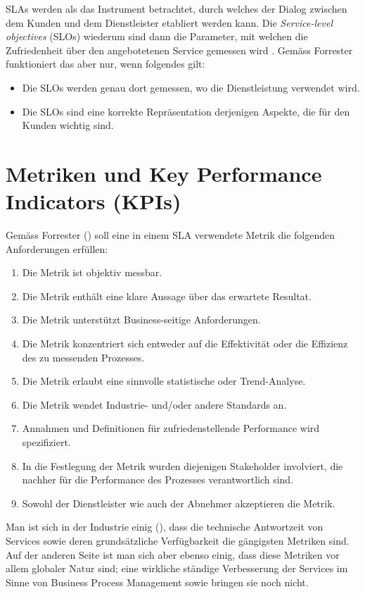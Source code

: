 \documentclass[11pt,listof=totoc]{scrreprt} %
\theoremstyle{definition}
\begin{document}
SLAs werden als das Instrument betrachtet, durch welches der Dialog zwischen dem Kunden und dem Dienstleister etabliert werden kann. Die {\em Service-level objectives} (SLOs) wiederum sind dann die Parameter, mit welchen die Zufriedenheit über den angebotetenen Service gemessen wird \cite{forrester:slaBestPractices}. Gemäss Forrester funktioniert das aber nur, wenn folgendes gilt:

\begin{itemize}
\item Die SLOs werden genau dort gemessen, wo die Dienstleistung verwendet wird.
\item Die SLOs sind eine korrekte Repräsentation derjenigen Aspekte, die für den Kunden wichtig sind.
\end{itemize}

\section{Metriken und Key Performance Indicators (KPIs)}

Gemäss Forrester (\cite{forrester:slaBestPractices}) soll eine in einem SLA verwendete Metrik die folgenden Anforderungen erfüllen:

\begin{enumerate}
\item Die Metrik ist objektiv messbar.
\item Die Metrik enthält eine klare Aussage über das erwartete Resultat.
\item Die Metrik unterstützt Business-seitige Anforderungen.
\item Die Metrik konzentriert sich entweder auf die Effektivität oder die Effizienz des zu messenden Prozesses.
\item Die Metrik erlaubt eine sinnvolle statistische oder Trend-Analyse.
\item Die Metrik wendet Industrie- und/oder andere Standards an.
\item Annahmen und Definitionen für zufriedenstellende Performance wird spezifiziert.
\item In die Festlegung der Metrik wurden diejenigen Stakeholder involviert, die nachher für die Performance des Prozesses verantwortlich sind.
\item Sowohl der Dienstleister wie auch der Abnehmer akzeptieren die Metrik.
\end{enumerate}

Man ist sich in der Industrie einig (\cite{forrester:slaBestPractices, EllisKauferstein200311}), dass die technische Antwortzeit von Services sowie deren grundsätzliche Verfügbarkeit die gängigsten Metriken sind. Auf der anderen Seite ist man sich aber ebenso einig, dass diese Metriken vor allem globaler Natur sind; eine wirkliche ständige Verbesserung der Services im Sinne von Business Process Management sowie \cite{EllisKauferstein200311} bringen sie noch nicht.
\end{document}
